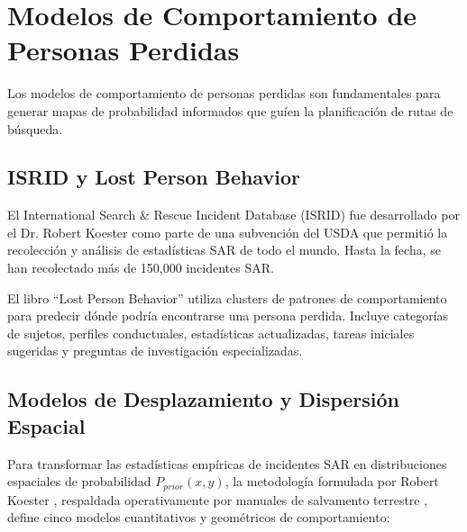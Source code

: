 \section{Modelos de Comportamiento de Personas Perdidas}

Los modelos de comportamiento de personas perdidas son fundamentales para generar mapas de probabilidad informados que guíen la planificación de rutas de búsqueda.

\subsection{ISRID y Lost Person Behavior}

El International Search \& Rescue Incident Database (ISRID) fue desarrollado por el Dr. Robert Koester como parte de una subvención del USDA que permitió la recolección y análisis de estadísticas SAR de todo el mundo. Hasta la fecha, se han recolectado más de 150,000 incidentes SAR.

El libro ``Lost Person Behavior'' \cite{koester2008lost} utiliza clusters de patrones de comportamiento para predecir dónde podría encontrarse una persona perdida. Incluye categorías de sujetos, perfiles conductuales, estadísticas actualizadas, tareas iniciales sugeridas y preguntas de investigación especializadas.

\subsection{Modelos de Desplazamiento y Dispersión Espacial}

Para transformar las estadísticas empíricas de incidentes SAR en distribuciones espaciales de probabilidad $P_{prior}(x,y)$, la metodología formulada por Robert Koester \cite{koester2008lost}, respaldada operativamente por manuales de salvamento terrestre \cite{romero2018manual}, define cinco modelos cuantitativos y geométricos de comportamiento:

